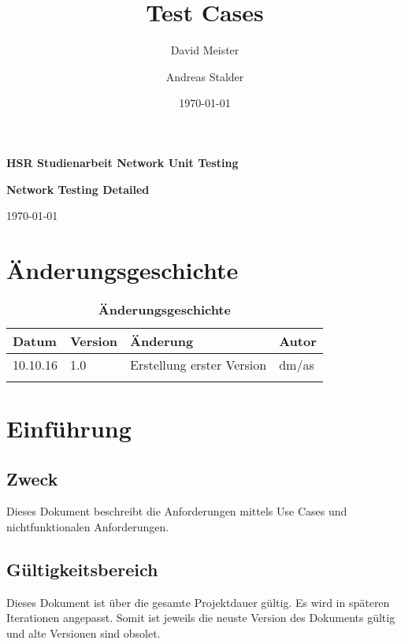 \documentclass[a4,12pt]{scrartcl}
\title{Test Cases}
\author{David Meister \and Andreas Stalder}
\date{\today}
\begin{document}
\begin{titlepage}
	\centering
	\vspace{5cm}
	\begin{center}
	\end{center}
	\vspace{8cm}
	\raggedright
	{\bfseries HSR Studienarbeit Network Unit Testing\par}
	{\huge\bfseries Network Testing Detailed\par}
	\vspace{1cm}
	{\theauthor \par}
	{\today\par}

\end{titlepage}

\section{Änderungsgeschichte}

\begin{table}[htb]
\centering
    \begin{tabular}{@{} l l l l@{}}\toprule    
    {Datum} & {Version} & {Änderung} & {Autor}\\ \midrule
    10.10.16 & 1.0 & Erstellung erster Version & dm/as\\ \addlinespace
    \end{tabular}
\caption{\textbf{Änderungsgeschichte}}
\end{table}

\newpage

\tableofcontents
\newpage


\section{Einführung}
\subsection{Zweck}
Dieses Dokument beschreibt die Anforderungen mittels Use Cases und nichtfunktionalen
Anforderungen.
\subsection{Gültigkeitsbereich}
Dieses Dokument ist über die gesamte Projektdauer gültig. Es wird in späteren Iterationen angepasst. Somit ist jeweils die neuste Version des Dokuments gültig und alte Versionen sind obsolet.
\end{document}
